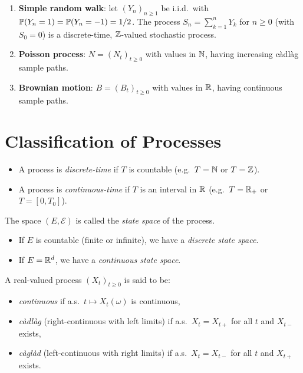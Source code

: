 \begin{example}
\begin{enumerate}
  \item \textbf{Simple random walk}: let $(Y_n)_{n \geq 1}$ be i.i.d.\ with
    $\mathbb{P}(Y_n = 1) = \mathbb{P}(Y_n = -1) = 1/2$. The process $S_n = \sum_{k=1}^{n} Y_k$
    for $n \geq 0$ (with $S_0 = 0$) is a discrete-time, $\mathbb{Z}$-valued stochastic process.
  \item \textbf{Poisson process}: $N = (N_t)_{t \geq 0}$ with values in $\mathbb{N}$,
    having increasing c\`adl\`ag sample paths.
  \item \textbf{Brownian motion}: $B = (B_t)_{t \geq 0}$ with values in $\mathbb{R}$,
    having continuous sample paths.
\end{enumerate}
\end{example}

\section{Classification of Processes}

\begin{definition}
\begin{itemize}
  \item A process is \emph{discrete-time} if $T$ is countable
    (e.g.\ $T = \mathbb{N}$ or $T = \mathbb{Z}$).
  \item A process is \emph{continuous-time} if $T$ is an interval in $\mathbb{R}$
    (e.g.\ $T = \mathbb{R}_+$ or $T = [0, T_0]$).
\end{itemize}
\end{definition}

\begin{definition}
The space $(E, \mathcal{E})$ is called the \emph{state space} of the process.
\begin{itemize}
  \item If $E$ is countable (finite or infinite), we have a \emph{discrete state space}.
  \item If $E = \mathbb{R}^d$, we have a \emph{continuous state space}.
\end{itemize}
\end{definition}

\begin{definition}
A real-valued process $(X_t)_{t \geq 0}$ is said to be:
\begin{itemize}
  \item \emph{continuous} if a.s.\ $t \mapsto X_t(\omega)$ is continuous,
  \item \emph{c\`adl\`ag} (right-continuous with left limits) if a.s.\
    $X_t = X_{t+}$ for all $t$ and $X_{t-}$ exists,
  \item \emph{c\`agl\`ad} (left-continuous with right limits) if a.s.\
    $X_t = X_{t-}$ for all $t$ and $X_{t+}$ exists.
\end{itemize}
\end{definition}

